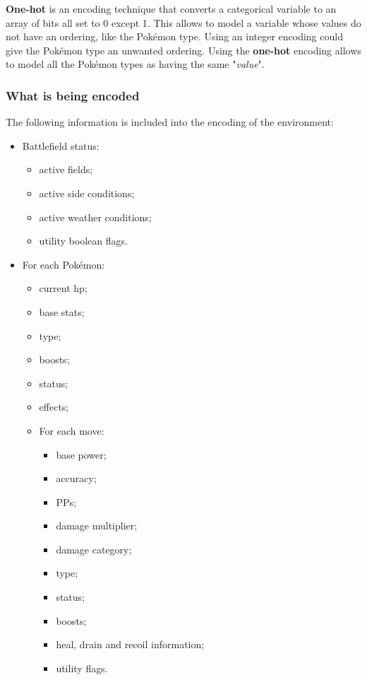 \documentclass{article}
\begin{document}
\textbf{One-hot} is an encoding technique that converts a categorical variable to an array of bits all set to 0 except 1.
This allows to model a variable whose values do not have an ordering, like the Pokémon type.
Using an integer encoding could give the Pokémon type an unwanted ordering.
Using the \textbf{one-hot} encoding allows to model all the Pokémon types as having the same "\textit{value}".

\subsubsection{What is being encoded} \label{encoding}

The following information is included into the encoding of the environment:
\begin{itemize}
    \item Battlefield status:
    \begin{itemize}
        \item active fields;
        \item active side conditions;
        \item active weather conditions;
        \item utility boolean flags.
    \end{itemize}
    \item For each Pokémon:
    \begin{itemize}
        \item current hp;
        \item base stats;
        \item type;
        \item boosts;
        \item status;
        \item effects;
        \item For each move:
        \begin{itemize}
            \item base power;
            \item accuracy;
            \item PPs;
            \item damage multiplier;
            \item damage category;
            \item type;
            \item status;
            \item boosts;
            \item heal, drain and recoil information;
            \item utility flags.
        \end{itemize}
    \end{itemize}
\end{itemize}
\end{document}
